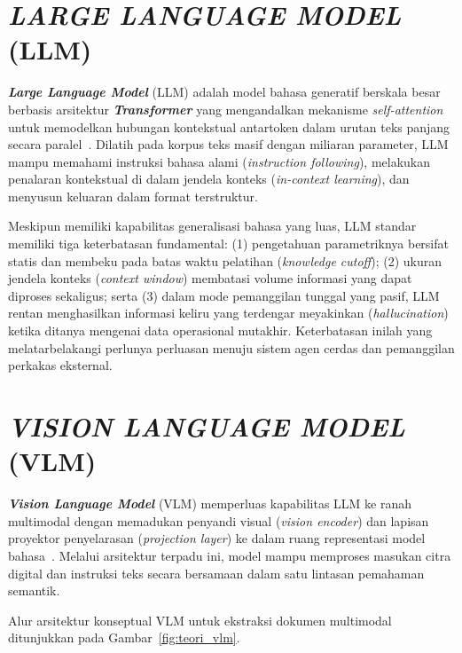 \section{\textit{LARGE LANGUAGE MODEL} (LLM)}

\textbf{\textit{Large Language Model}} (LLM) adalah model bahasa generatif berskala besar berbasis arsitektur \textbf{\textit{Transformer}} yang mengandalkan mekanisme \textit{self-attention} untuk memodelkan hubungan kontekstual antartoken dalam urutan teks panjang secara paralel~\cite{vaswani2017attention}. Dilatih pada korpus teks masif dengan miliaran parameter, LLM mampu memahami instruksi bahasa alami (\textit{instruction following}), melakukan penalaran kontekstual di dalam jendela konteks (\textit{in-context learning}), dan menyusun keluaran dalam format terstruktur.

Meskipun memiliki kapabilitas generalisasi bahasa yang luas, LLM standar memiliki tiga keterbatasan fundamental: (1) pengetahuan parametriknya bersifat statis dan membeku pada batas waktu pelatihan (\textit{knowledge cutoff}); (2) ukuran jendela konteks (\textit{context window}) membatasi volume informasi yang dapat diproses sekaligus; serta (3) dalam mode pemanggilan tunggal yang pasif, LLM rentan menghasilkan informasi keliru yang terdengar meyakinkan (\textit{hallucination}) ketika ditanya mengenai data operasional mutakhir. Keterbatasan inilah yang melatarbelakangi perlunya perluasan menuju sistem agen cerdas dan pemanggilan perkakas eksternal.

\section{\textit{VISION LANGUAGE MODEL} (VLM)}

\textbf{\textit{Vision Language Model}} (VLM) memperluas kapabilitas LLM ke ranah multimodal dengan memadukan penyandi visual (\textit{vision encoder}) dan lapisan proyektor penyelarasan (\textit{projection layer}) ke dalam ruang representasi model bahasa~\cite{liu2023visual}. Melalui arsitektur terpadu ini, model mampu memproses masukan citra digital dan instruksi teks secara bersamaan dalam satu lintasan pemahaman semantik.

Alur arsitektur konseptual VLM untuk ekstraksi dokumen multimodal ditunjukkan pada Gambar~\ref{fig:teori_vlm}.

